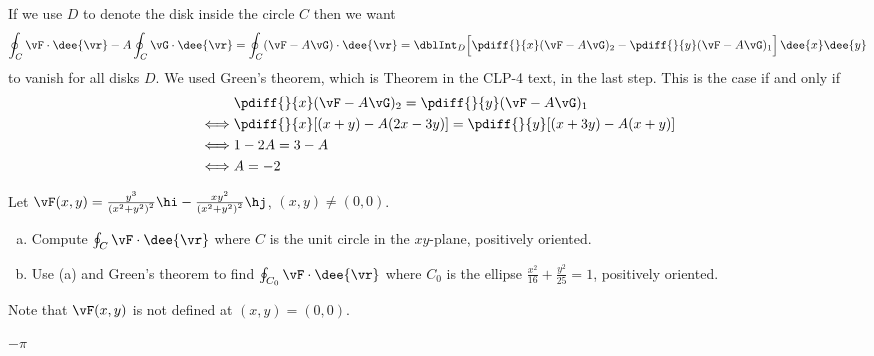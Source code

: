 \begin{solution}
If we use $D$ to denote the disk inside the circle $C$
then we want
$$
\oint_C\vF\cdot \dee{\vr}-A\oint_C\vG\cdot \dee{\vr}
=\oint_C(\vF-A\vG)\cdot \dee{\vr}
=\dblInt_D \Big[\pdiff{}{x}(\vF-A\vG)_2
-\pdiff{}{y}(\vF-A\vG)_1\Big]\,\dee{x}\dee{y}
$$
to vanish for all disks $D$. We used Green's theorem, which is Theorem
 in the CLP-4 text,  in the last step.
This is the case if and only if
\begin{align*}
&\pdiff{}{x}(\vF-A\vG)_2
=\pdiff{}{y}(\vF-A\vG)_1\\
\iff&
\pdiff{}{x}[(x+y)-A(2x-3y)]
=\pdiff{}{y}[(x+3y)-A(x+y)]\\
\iff&
1-2A=3-A\\
\iff& A=-2
\end{align*}
\end{solution}

\begin{question}[M317 2001D] %
Let
$\vF(x,y) = \frac{y^3}{ {(x^2+y^2)}^2}\hi
              -\frac{xy^2}{ {(x^2+y^2)}^2}\hj$, $(x,y)\ne (0,0)$.
\smallskip
\begin{enumerate}[(a)]
\item
Compute $\oint_C\vF\cdot \dee{\vr}$ where $C$ is the unit circle
in the $xy$-plane, positively oriented.

\item
Use (a) and Green's theorem to find $\oint_{C_0}\vF\cdot \dee{\vr}$
where $C_0$ is the ellipse $\frac{x^2}{16}+\frac{y^2}{25}=1$, positively
oriented.

\end{enumerate}
\end{question}

\begin{hint}
Note that $\vF(x,y)$ is not defined at $(x,y)=(0,0)$.
\end{hint}

\begin{answer}
$-\pi$
\end{answer}

